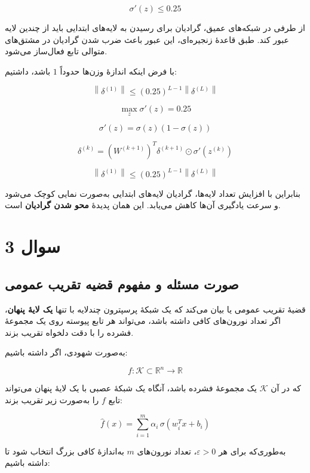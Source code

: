 \documentclass[12pt,a4paper]{article}
\begin{document}
\[
\boxed{
	\sigma'(z)\leq 0.25
}
\]

از طرفی در شبکه‌های عمیق، گرادیان برای رسیدن به لایه‌های ابتدایی باید از چندین لایه عبور کند. طبق قاعدهٔ زنجیره‌ای، این عبور باعث ضرب شدن گرادیان در مشتق‌های متوالی تابع فعال‌ساز می‌شود.

با فرض اینکه اندازهٔ وزن‌ها حدوداً \(1\) باشد، داشتیم:

\[
\boxed{
	\left\|\delta^{(1)}\right\|
	\leq
	(0.25)^{L-1}
	\left\|\delta^{(L)}\right\|
}
\]

\begin{tcolorbox}[
	colback=softgray,
	colframe=mainblue,
	title=پاسخ نهایی فشرده
	]
	\[
	\boxed{
		\max_z \sigma'(z)=0.25
	}
	\]
	
	\[
	\boxed{
		\sigma'(z)=\sigma(z)(1-\sigma(z))
	}
	\]
	
	\[
	\boxed{
		\delta^{(k)}
		=
		\left(W^{(k+1)}\right)^T
		\delta^{(k+1)}
		\odot
		\sigma'(z^{(k)})
	}
	\]
	
	\[
	\boxed{
		\left\|\delta^{(1)}\right\|
		\leq
		(0.25)^{L-1}
		\left\|\delta^{(L)}\right\|
	}
	\]
	
	بنابراین با افزایش تعداد لایه‌ها، گرادیان لایه‌های ابتدایی به‌صورت نمایی کوچک می‌شود و سرعت یادگیری آن‌ها کاهش می‌یابد. این همان پدیدهٔ \textbf{محو شدن گرادیان} است.
\end{tcolorbox}
\section{سوال 3}

\subsection{صورت مسئله و مفهوم قضیه تقریب عمومی}

قضیهٔ تقریب عمومی یا  بیان می‌کند که یک شبکهٔ پرسپترون چندلایه با تنها \textbf{یک لایهٔ پنهان}، اگر تعداد نورون‌های کافی داشته باشد، می‌تواند هر تابع پیوسته روی یک مجموعهٔ فشرده را با دقت دلخواه تقریب بزند.

به‌صورت شهودی، اگر داشته باشیم:

\[
f:\mathcal{K}\subset \mathbb{R}^n \rightarrow \mathbb{R}
\]

که در آن \(\mathcal{K}\) یک مجموعهٔ فشرده باشد، آنگاه یک شبکهٔ عصبی با یک لایهٔ پنهان می‌تواند تابع \(f\) را به‌صورت زیر تقریب بزند:

\[
\hat{f}(x)=\sum_{i=1}^{m}\alpha_i \, \sigma(w_i^Tx+b_i)
\]

به‌طوری‌که برای هر \(\varepsilon>0\)، تعداد نورون‌های \(m\) به‌اندازهٔ کافی بزرگ انتخاب شود تا داشته باشیم:
\end{document}
